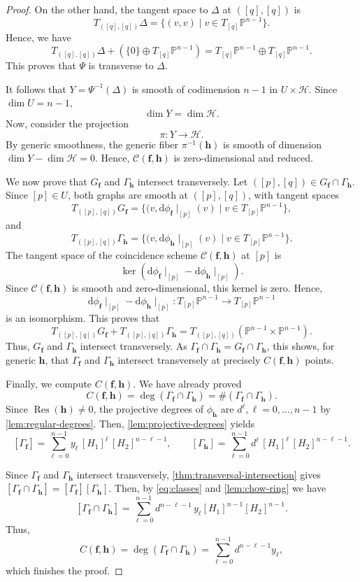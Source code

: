\documentclass[11pt,letterpaper]{article}
\numberwithin{equation}{section}
\newcommand{\PP}{\mathbb{P}}
\newcommand{\ff}{\ensuremath{\boldsymbol{f}}}
\newcommand{\hh}{\ensuremath{\boldsymbol{h}}}
\DeclareMathOperator{\Res}{Res}
\begin{document}
\begin{proof}
On the other hand, the tangent space to $\Delta$ at $([q],[q])$ is \[
T_{([q],[q])} \Delta = \{(v,v)\mid v\in T_{[q]}\PP^{n-1}\}.
\] Hence, we have \[
T_{([q],[q])} \Delta + \left(\{0\}\oplus T_{[q]}\PP^{n-1} \right) = T_{[q]}\PP^{n-1}\oplus T_{[q]}\PP^{n-1}.
\]
This proves that $\Psi$ is transverse to $\Delta$.

It follows that $Y=\Psi^{-1}(\Delta)$ is smooth of codimension $n-1$ in $U\times \mathcal{H}$.
Since $\dim U=n-1$, \[
\dim Y = \dim \mathcal{H}.
\] Now, consider the projection \[
\pi: Y\rightarrow \mathcal{H}.
\] By generic smoothness, the generic fiber $\pi^{-1}(\hh)$ is smooth of dimension $\dim Y-\dim \mathcal{H}= 0$.
Hence, $\mathcal{C}(\ff,\hh)$ is zero-dimensional and reduced.

We now prove that $G_{\ff}$ and $\Gamma_{\hh}$ intersect transversely.
Let $([p],[q])\in G_{\ff}\cap \Gamma_{\hh}$.
Since $[p]\in U$, both graphs are smooth at $([p],[q])$, with tangent spaces \[
T_{([p],[q])} G_{\ff} = \{(v,\mathrm{d} \phi_{\ff}\mid_{[p]}(v) \mid v\in T_{[p]}\PP^{n-1}\},
\] and \[
T_{([p],[q])} \Gamma_{\hh} = \{(v,\mathrm{d} \phi_{\hh}\mid_{[p]}(v) \mid v\in T_{[p]}\PP^{n-1}\}.
\] The tangent space of the coincidence scheme $\mathcal{C}(\ff,\hh)$ at $[p]$ is \[
\ker ( \mathrm{d} \phi_{\ff}\mid_{[p]} - \mathrm{d} \phi_{\hh}\mid_{[p]} ).
\] Since $\mathcal{C}(\ff,\hh)$ is smooth and zero-dimensional, this kernel is zero.
Hence, \[
\mathrm{d} \phi_{\ff}\mid_{[p]} - \mathrm{d} \phi_{\hh}\mid_{[p]} : T_{[p]}\PP^{n-1}\rightarrow T_{[p]}\PP^{n-1}
\] is an isomorphism.
This proves that \[
T_{([p],[q])} G_{\ff} + T_{([p],[q])} \Gamma_{\hh} = T_{([p],[q])}\left( \PP^{n-1}\times\PP^{n-1}\right).
\] Thus, $G_{\ff}$ and $\Gamma_{\hh}$ intersect transversely.
As $\Gamma_{\ff}\cap\Gamma_{\hh}=G_{\ff}\cap \Gamma_{\hh}$, this shows, for generic $\hh$, that $\Gamma_{\ff}$ and $\Gamma_{\hh}$ intersect transversely at precisely $C(\ff,\hh)$ points.

Finally, we compute $C(\ff,\hh)$.
We have already proved \[
C(\ff,\hh) = \deg\left(\Gamma_{\ff}\cap\Gamma_{\hh}\right) =\#(\Gamma_{\ff}\cap\Gamma_{\hh}).
\] 
Since $\Res(\hh)\neq 0$, the projective degrees of $\phi_{\hh}$ are $d^\ell, \ell=0,\dots,n-1$ by \cref{lem:regular-degrees}.
Then, \cref{lem:projective-degrees} yields \begin{equation}
\label{eq:classes}
[\Gamma_{\ff}] = \sum_{\ell=0}^{n-1} y_\ell \, [H_1]^{\ell} \, [H_2]^{n-\ell-1}, \qquad [\Gamma_{\hh}] = \sum_{\ell=0}^{n-1} d^\ell \, [H_1]^{\ell} \, [H_2]^{n-\ell-1}.
\end{equation}

Since $\Gamma_{\ff}$ and $\Gamma_{\hh}$ intersect transversely, \cref{thm:transversal-intersection} gives $[\Gamma_{\ff}\cap\Gamma_{\hh}]=[\Gamma_{\ff}][\Gamma_{\hh}]$.   
   Then, by \cref{eq:classes} and \cref{lem:chow-ring} we have \[
    [\Gamma_{\ff}\cap \Gamma_{\hh}] = \sum_{\ell=0}^{n-1} d^{n-\ell-1}\, y_\ell [H_1]^{n-1} [H_2]^{n-1}.
    \]
    Thus, \[
    C(\ff,\hh)= \deg\left(\Gamma_{\ff}\cap \Gamma_{\hh}\right) = \sum_{\ell=0}^{n-1} d^{n-\ell-1} y_\ell,
    \] which finishes the proof.
\end{proof}
\end{document}
